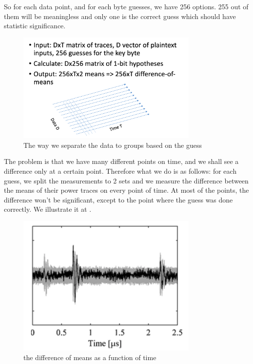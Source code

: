 So for each data point, and for each byte guesses, we have 256 options. 255 out of them will be meaningless and only one is the correct guess which should have statistic significance.

\begin{figure}[!ht]
    \centering
    \includegraphics[width=0.8\textwidth]{images/Lecture6/dpa-separation-figure.png}
    \caption{The way we separate the data to groups based on the guess} \label{fig:dpa-separation-figure}
\end{figure}

The problem is that we have many different points on time, and we shall see a difference only at a certain point. Therefore what we do is as follows: for each guess, we split the measurements to 2 sets and we measure the difference between the means of their power traces on every point of time. At most of the points, the difference won't be significant, except to the point where the guess was done correctly. We illustrate it at .

\begin{figure}[!ht]
    \centering
    \includegraphics[width=0.8\textwidth]{images/Lecture6/meansDiffFigure.png}
    \caption{the difference of means as a function of time}
    \label{fig:meansDiffFigure}
\end{figure}

